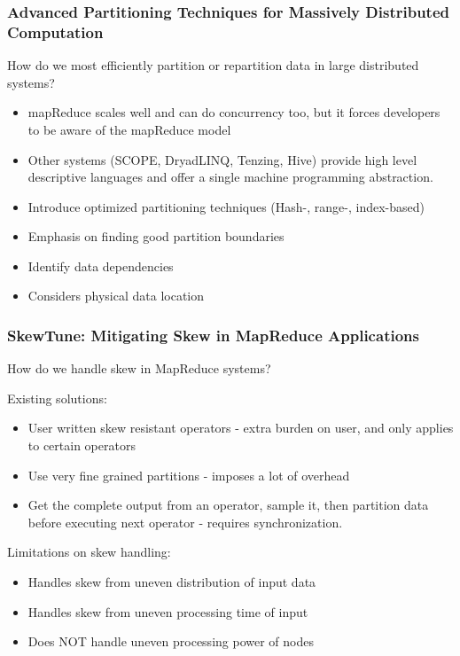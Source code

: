 \begin{frame}[plain] %
\frametitle{Advanced Partitioning Techniques for Massively Distributed Computation}


How do we most efficiently partition or repartition data in large distributed systems?

\vspace{1em}

\begin{itemize}
\item mapReduce scales well and can do concurrency too, but it forces developers to be aware of the mapReduce model
\item Other systems (SCOPE, DryadLINQ, Tenzing, Hive) provide high level descriptive languages and offer a single machine programming abstraction. 
\end{itemize}

\vspace{1em}

\begin{itemize}
\item Introduce optimized partitioning techniques (Hash-, range-, index-based)
\item Emphasis on finding good partition boundaries
\item Identify data dependencies
\item Considers physical data location
\end{itemize}

\end{frame}

\begin{frame}[plain] %
\frametitle{SkewTune: Mitigating Skew in MapReduce Applications}

How do we handle skew in MapReduce systems?

\vspace{1em}

Existing solutions:
\begin{itemize}
\item User written skew resistant operators - extra burden on user, and only applies to certain operators
\item Use very fine grained partitions - imposes a lot of overhead
\item Get the complete output from an operator, sample it, then partition data before executing next operator - requires synchronization.
\end{itemize}

\vspace{1em}

Limitations on skew handling:
\begin{itemize}
\item Handles skew from uneven distribution of input data
\item Handles skew from uneven processing time of input
\item Does NOT handle uneven processing power of nodes
\end{itemize}

\end{frame}


